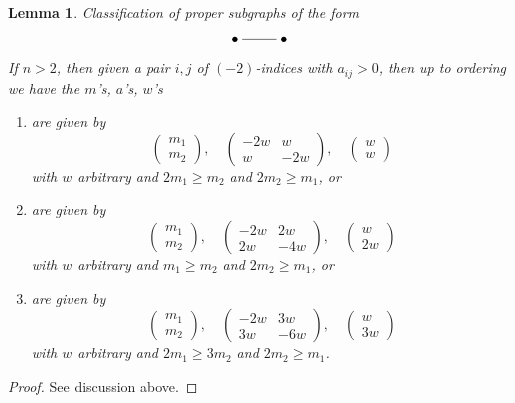 \documentclass{stacks-project}
\theoremstyle{plain}
\newtheorem{lemma}[subsection]{Lemma}
\theoremstyle{definition}
\theoremstyle{remark}
\numberwithin{equation}{subsection}
\begin{document}
\begin{lemma}
\label{lemma-two-by-two}
Classification of proper subgraphs of the form
$$
\xymatrix{
\bullet \ar@{-}[r] & \bullet
}
$$
If $n > 2$, then given a pair $i, j$ of $(-2)$-indices with $a_{ij} > 0$,
then up to ordering we have the $m$'s, $a$'s, $w$'s
\begin{enumerate}
\item
\label{item-A2}
are given by
$$
\left(
\begin{matrix}
m_1 \\
m_2
\end{matrix}
\right),
\quad
\left(
\begin{matrix}
-2w & w \\
w & -2w
\end{matrix}
\right),
\quad
\left(
\begin{matrix}
w \\
w
\end{matrix}
\right)
$$
with $w$ arbitrary and $2m_1 \geq m_2$ and $2m_2 \geq m_1$, or
\item
\label{item-B2}
are given by
$$
\left(
\begin{matrix}
m_1 \\
m_2
\end{matrix}
\right),
\quad
\left(
\begin{matrix}
-2w & 2w \\
2w & -4w
\end{matrix}
\right),
\quad
\left(
\begin{matrix}
w \\
2w
\end{matrix}
\right)
$$
with $w$ arbitrary and $m_1 \geq m_2$ and $2m_2 \geq m_1$, or
\item
\label{item-G2}
are given by
$$
\left(
\begin{matrix}
m_1 \\
m_2
\end{matrix}
\right),
\quad
\left(
\begin{matrix}
-2w & 3w \\
3w & -6w
\end{matrix}
\right),
\quad
\left(
\begin{matrix}
w \\
3w
\end{matrix}
\right)
$$
with $w$ arbitrary and $2m_1 \geq 3m_2$ and $2m_2 \geq m_1$.
\end{enumerate}
\end{lemma}

\begin{proof}
See discussion above.
\end{proof}
\end{document}
